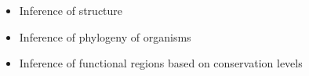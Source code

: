 \documentclass[landscape]{slides}
\begin{document}

\begin{slide}


\begin{itemize}
\item Inference of  structure
\item Inference of phylogeny of organisms
\item Inference of functional regions based on conservation levels
\end{itemize}

\vfill
\end{slide}
\begin{slide}
\end{slide}
\end{document}
